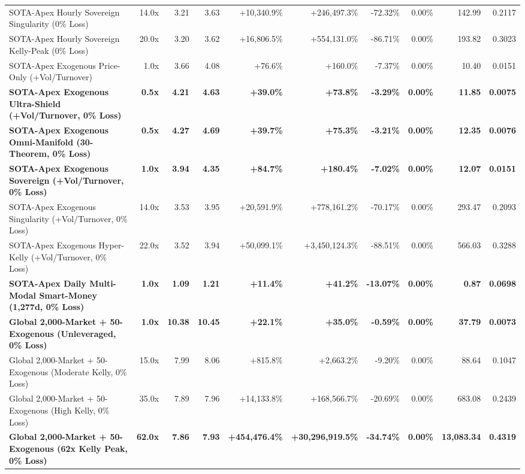 \documentclass[10pt,a4paper]{article}
\begin{document}
\begin{table}[ht!]
{\begin{tabular}{lrrrrrrrrr}
SOTA-Apex Hourly Sovereign Singularity (0\% Loss) & 14.0x & 3.21 & 3.63 & +10,340.9\% & +246,497.3\% & -72.32\% & 0.00\% & 142.99 & 0.2117 \\
SOTA-Apex Hourly Sovereign Kelly-Peak (0\% Loss) & 20.0x & 3.20 & 3.62 & +16,806.5\% & +554,131.0\% & -86.71\% & 0.00\% & 193.82 & 0.3023 \\
SOTA-Apex Exogenous Price-Only (+Vol/Turnover) & 1.0x & 3.66 & 4.08 & +76.6\% & +160.0\% & -7.37\% & 0.00\% & 10.40 & 0.0151 \\
\textbf{SOTA-Apex Exogenous Ultra-Shield (+Vol/Turnover, 0\% Loss)} & \textbf{0.5x} & \textbf{4.21} & \textbf{4.63} & \textbf{+39.0\%} & \textbf{+73.8\%} & \textbf{-3.29\%} & \textbf{0.00\%} & \textbf{11.85} & \textbf{0.0075} \\
\textbf{SOTA-Apex Exogenous Omni-Manifold (30-Theorem, 0\% Loss)} & \textbf{0.5x} & \textbf{4.27} & \textbf{4.69} & \textbf{+39.7\%} & \textbf{+75.3\%} & \textbf{-3.21\%} & \textbf{0.00\%} & \textbf{12.35} & \textbf{0.0076} \\
\textbf{SOTA-Apex Exogenous Sovereign (+Vol/Turnover, 0\% Loss)} & \textbf{1.0x} & \textbf{3.94} & \textbf{4.35} & \textbf{+84.7\%} & \textbf{+180.4\%} & \textbf{-7.02\%} & \textbf{0.00\%} & \textbf{12.07} & \textbf{0.0151} \\
SOTA-Apex Exogenous Singularity (+Vol/Turnover, 0\% Loss) & 14.0x & 3.53 & 3.95 & +20,591.9\% & +778,161.2\% & -70.17\% & 0.00\% & 293.47 & 0.2093 \\
SOTA-Apex Exogenous Hyper-Kelly (+Vol/Turnover, 0\% Loss) & 22.0x & 3.52 & 3.94 & +50,099.1\% & +3,450,124.3\% & -88.51\% & 0.00\% & 566.03 & 0.3288 \\
\textbf{SOTA-Apex Daily Multi-Modal Smart-Money (1,277d, 0\% Loss)} & \textbf{1.0x} & \textbf{1.09} & \textbf{1.21} & \textbf{+11.4\%} & \textbf{+41.2\%} & \textbf{-13.07\%} & \textbf{0.00\%} & \textbf{0.87} & \textbf{0.0698} \\
\textbf{Global 2,000-Market + 50-Exogenous (Unleveraged, 0\% Loss)} & \textbf{1.0x} & \textbf{10.38} & \textbf{10.45} & \textbf{+22.1\%} & \textbf{+35.0\%} & \textbf{-0.59\%} & \textbf{0.00\%} & \textbf{37.79} & \textbf{0.0073} \\
Global 2,000-Market + 50-Exogenous (Moderate Kelly, 0\% Loss) & 15.0x & 7.99 & 8.06 & +815.8\% & +2,663.2\% & -9.20\% & 0.00\% & 88.64 & 0.1047 \\
Global 2,000-Market + 50-Exogenous (High Kelly, 0\% Loss) & 35.0x & 7.89 & 7.96 & +14,133.8\% & +168,566.7\% & -20.69\% & 0.00\% & 683.08 & 0.2439 \\
\textbf{Global 2,000-Market + 50-Exogenous (62x Kelly Peak, 0\% Loss)} & \textbf{62.0x} & \textbf{7.86} & \textbf{7.93} & \textbf{+454,476.4\%} & \textbf{+30,296,919.5\%} & \textbf{-34.74\%} & \textbf{0.00\%} & \textbf{13,083.34} & \textbf{0.4319} \\
\bottomrule
\end{tabular}}
\end{table}
\end{document}
